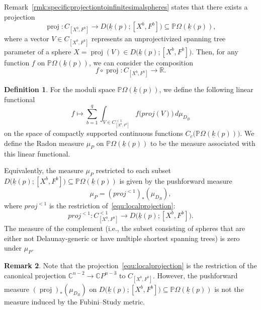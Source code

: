 \documentclass{compositio}
\numberwithin{equation}{section}
\numberwithin{figure}{section}
\theoremstyle{definition}
\newtheorem{definition}{Definition}[section]
\newtheorem{remark}[definition]{Remark}
\theoremstyle{plain}
\begin{document}
{Remark~\ref{rmk:specificprojectiontoinfinitesimalspheres} states that there exists a projection
\begin{equation}\label{equ:localprojection}
    \operatorname{proj}: C_{[X^b,F^b]}\to D\Big(\underline{k}(p);[X^b, F^b]\Big)\subseteq \mathbb{P}\Omega(\underline{k}(p)),
\end{equation}
where a vector $V\in C_{[X^b,F^b]}$ represents an unprojectivized spanning tree parameter of a sphere $X = \operatorname{proj}(V)\in D\Big(\underline{k}(p);[X^b, F^b]\Big)$. Then, for any function $f$ on $\mathbb{P}\Omega(\underline{k}(p))$, we can consider the composition 
$$
f\circ \operatorname{proj}: C_{[X^b,F^b]}\to \mathbb{R}.
$$

\begin{definition}
    For the moduli space $\mathbb{P}\Omega(\underline{k}(p))$, we define the following linear functional 
    \begin{equation}
        f \mapsto \sum_{b=1}^q\int_{V\in C_{[X^b,F^b]}^{<1}} f\big(proj(V)\big) \, d\mu_{D_B}    
    \end{equation}
    on the space of compactly supported continuous functions $C_c\big(\mathbb{P}\Omega(\underline{k}(p))\big)$.    We define the Radon measure  $\mu_P$ on $\mathbb{P}\Omega(\underline{k}(p))$ to be the measure associated with this linear functional.
\end{definition}

Equivalently, the measure $\mu_P$ restricted to each subset $D\big(\underline{k}(p);[X^b, F^b]\big)\subseteq \mathbb{P}\Omega(\underline{k}(p))$ is given by the pushforward measure
$$
\mu_P = (proj^{<1})_{\ast}(\mu_{D_B}),
$$
where $proj^{<1}$ is the restriction of~\eqref{equ:localprojection}:
\begin{equation}
    proj^{<1}: C_{[X^b,F^b]}^{<1} \to D\Big(\underline{k}(p);[X^b, F^b]\Big).
\end{equation}
The measure of the complement (i.e., the subset consisting of spheres that are either not Delaunay-generic or have multiple shortest spanning trees) is zero under $\mu_P$.

\begin{remark}
    Note that the projection~\eqref{equ:localprojection} is the restriction of the canonical projection $\mathbb{C}^{n-2} \to \mathbb{C}P^{n-3}$ to $C_{[X^b,F^b]}$. However, the pushforward measure $(\operatorname{proj})_{\ast}(\mu_{D_B})$ on $D\Big(\underline{k}(p);[X^b, F^b]\Big)\subseteq \mathbb{P}\Omega(\underline{k}(p))$ is not the measure induced by the Fubini–Study metric. 


\end{remark}}
\end{document}

